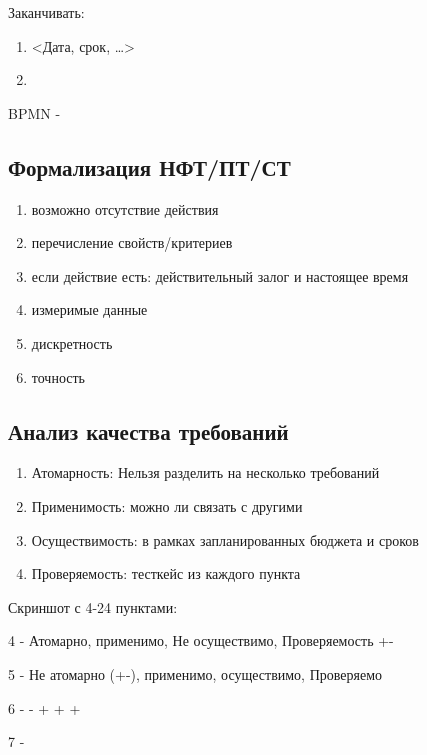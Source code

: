 \documentclass[a4paper,12pt]{article}
\begin{document}
Заканчивать:


\begin{enumerate}
    \item <Дата, срок, …>
    \item <за счет>
\end{enumerate}


BPMN - 

\subsection{Формализация НФТ/ПТ/СТ}

\begin{enumerate}
    \item возможно отсутствие действия
    \item перечисление свойств/критериев
    \item если действие есть: действительный залог и настоящее время
    \item измеримые данные
    \item дискретность
    \item точность
\end{enumerate}

\subsection{Анализ качества требований}

\begin{enumerate}
    \item Атомарность: Нельзя разделить на несколько требований
    \item Применимость: можно ли связать с другими
    \item Осуществимость: в рамках запланированных бюджета и сроков
    \item Проверяемость: тесткейс из каждого пункта
\end{enumerate}


Скриншот с 4-24 пунктами:


4 - Атомарно, применимо, Не осуществимо, Проверяемость +-


5 - Не атомарно (+-), применимо, осуществимо, Проверяемо


6 - - + + +


7 - 
\end{document}
